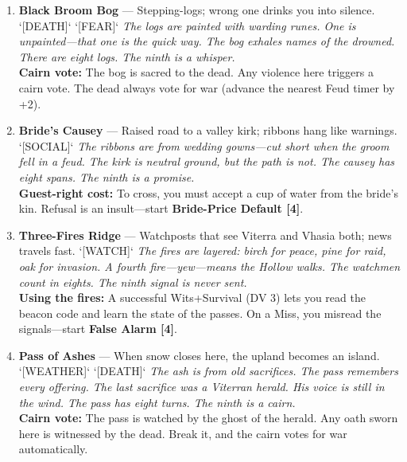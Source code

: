\begin{enumerate}
\item[J] \textbf{Black Broom Bog} --- Stepping-logs; wrong one drinks you into silence. `[DEATH]` `[FEAR]`
  \hfill \textit{The logs are painted with warding runes. One is unpainted---that one is the quick way. The bog exhales names of the drowned. There are eight logs. The ninth is a whisper.} \\
  \textbf{Cairn vote:} The bog is sacred to the dead. Any violence here triggers a cairn vote. The dead always vote for war (advance the nearest Feud timer by +2).

\item[Q] \textbf{Bride's Causey} --- Raised road to a valley kirk; ribbons hang like warnings. `[SOCIAL]`
  \hfill \textit{The ribbons are from wedding gowns---cut short when the groom fell in a feud. The kirk is neutral ground, but the path is not. The causey has eight spans. The ninth is a promise.} \\
  \textbf{Guest-right cost:} To cross, you must accept a cup of water from the bride's kin. Refusal is an insult---start \textbf{Bride-Price Default [4]}.

\item[K] \textbf{Three-Fires Ridge} --- Watchposts that see Viterra and Vhasia both; news travels fast. `[WATCH]`
  \hfill \textit{The fires are layered: birch for peace, pine for raid, oak for invasion. A fourth fire---yew---means the Hollow walks. The watchmen count in eights. The ninth signal is never sent.} \\
  \textbf{Using the fires:} A successful Wits+Survival (DV 3) lets you read the beacon code and learn the state of the passes. On a Miss, you misread the signals---start \textbf{False Alarm [4]}.

\item[A] \textbf{Pass of Ashes} --- When snow closes here, the upland becomes an island. `[WEATHER]` `[DEATH]`
  \hfill \textit{The ash is from old sacrifices. The pass remembers every offering. The last sacrifice was a Viterran herald. His voice is still in the wind. The pass has eight turns. The ninth is a cairn.} \\
  \textbf{Cairn vote:} The pass is watched by the ghost of the herald. Any oath sworn here is witnessed by the dead. Break it, and the cairn votes for war automatically.
\end{enumerate}

